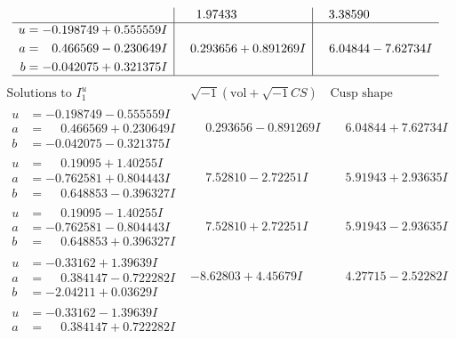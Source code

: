 \documentclass[1p]{elsarticle_modified}
\theoremstyle{definition}
\newcommand{\I}{\sqrt{-1}}
\begin{document}
$$\begin{array}{c|c|c}
 & \phantom{-}1.97433\phantom{ +0.000000I} & \phantom{-}3.38590\phantom{ +0.000000I} \\ \hline\begin{aligned}
u &= -0.198749 + 0.555559 I \\
a &= \phantom{-}0.466569 - 0.230649 I \\
b &= -0.042075 + 0.321375 I\end{aligned}
 & \phantom{-}0.293656 + 0.891269 I & \phantom{-}6.04844 - 7.62734 I\\
 \hline 
 \end{array}$$\newpage$$\begin{array}{c|c|c}  
\text{Solutions to }I^u_{1}& \I (\text{vol} + \sqrt{-1}CS) & \text{Cusp shape}\\
 \hline 
\begin{aligned}
u &= -0.198749 - 0.555559 I \\
a &= \phantom{-}0.466569 + 0.230649 I \\
b &= -0.042075 - 0.321375 I\end{aligned}
 & \phantom{-}0.293656 - 0.891269 I & \phantom{-}6.04844 + 7.62734 I \\ \hline\begin{aligned}
u &= \phantom{-}0.19095 + 1.40255 I \\
a &= -0.762581 + 0.804443 I \\
b &= \phantom{-}0.648853 - 0.396327 I\end{aligned}
 & \phantom{-}7.52810 - 2.72251 I & \phantom{-}5.91943 + 2.93635 I \\ \hline\begin{aligned}
u &= \phantom{-}0.19095 - 1.40255 I \\
a &= -0.762581 - 0.804443 I \\
b &= \phantom{-}0.648853 + 0.396327 I\end{aligned}
 & \phantom{-}7.52810 + 2.72251 I & \phantom{-}5.91943 - 2.93635 I \\ \hline\begin{aligned}
u &= -0.33162 + 1.39639 I \\
a &= \phantom{-}0.384147 - 0.722282 I \\
b &= -2.04211 + 0.03629 I\end{aligned}
 & -8.62803 + 4.45679 I & \phantom{-}4.27715 - 2.52282 I \\ \hline\begin{aligned}
u &= -0.33162 - 1.39639 I \\
a &= \phantom{-}0.384147 + 0.722282 I \\

\end{aligned}
\end{array}$$
\end{document}
